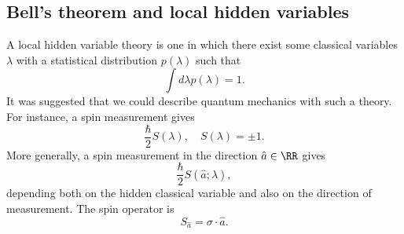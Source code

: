 \subsection*{Bell's theorem and local hidden variables}
A local hidden variable theory is one in which there exist some classical variables $\lambda$ with a statistical distribution $p(\lambda)$ such that
\begin{equation}
    \int d\lambda p(\lambda) =1.
\end{equation}
It was suggested that we could describe quantum mechanics with such a theory. For instance, a spin measurement gives
\begin{equation}
    \frac{\hbar}{2} S(\lambda), \quad S(\lambda) = \pm 1.
\end{equation}
More generally, a spin measurement in the direction $\hat a \in \RR$ gives
\begin{equation}
    \frac{\hbar}{2} S(\hat a; \lambda),
\end{equation}
depending both on the hidden classical variable and also on the direction of measurement. The spin operator is
\begin{equation}
    S_{\hat a} = \sigma \cdot \hat a.
\end{equation}

